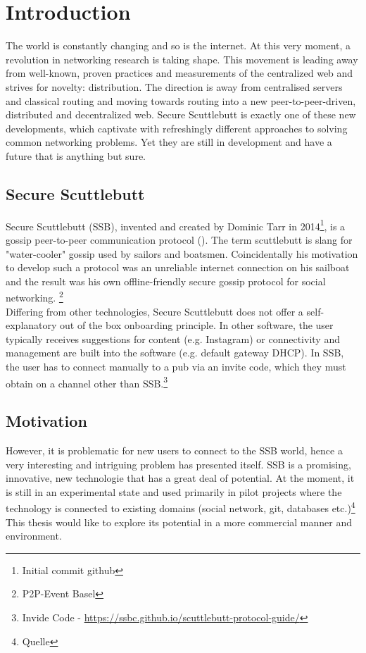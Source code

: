 \chapter{Introduction}
The world is constantly changing and so is the internet. At this very moment, a revolution in networking research is taking shape. This movement is leading away from well-known, proven practices and measurements of the centralized web and strives for novelty: distribution. The direction is away from centralised servers and classical routing and moving towards routing into a new peer-to-peer-driven, distributed and decentralized web. Secure Scuttlebutt is exactly one of these new developments, which captivate with refreshingly different approaches to solving common networking problems. Yet they are still in development and have a future that is anything but sure. 
\section{Secure Scuttlebutt}
Secure Scuttlebutt (SSB), invented and created by Dominic Tarr in 2014\footnote{Initial commit github}, is a gossip peer-to-peer communication protocol (\citet{tarr2019secure}). The term scuttlebutt is slang for "water-cooler" gossip used by sailors and boatsmen. Coincidentally his motivation to develop such a protocol was an unreliable internet connection on his sailboat and the result was his own offline-friendly secure gossip protocol for social networking. \footnote{P2P-Event Basel}\\

Differing from other technologies, Secure Scuttlebutt does not offer a self-explanatory out of the box onboarding principle. In other software, the user typically receives suggestions for content (e.g. Instagram) or connectivity and management are built into the software (e.g. default gateway DHCP). In SSB, the user has to connect manually to a pub via an invite code, which they must obtain on a channel other than SSB.\footnote{Invide Code - \url{https://ssbc.github.io/scuttlebutt-protocol-guide/}} 

\section{Motivation}
However, it is problematic for new users to connect to the SSB world, hence a very interesting and intriguing problem has presented itself. SSB is a promising, innovative, new technologie that has a great deal of potential. At the moment, it is still in an experimental state and used primarily in pilot projects where the technology is connected to existing domains (social network, git, databases etc.)\footnote{Quelle} This thesis would like to explore its potential in a more commercial manner and environment. 

